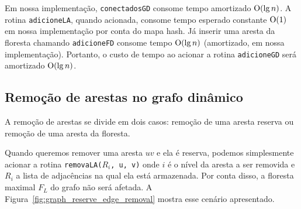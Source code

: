 Em nossa implementação, \texttt{conectadosGD} consome tempo amortizado $\mathrm{O}(\lg n)$. A rotina \texttt{adicioneLA}, quando acionada, consome tempo esperado constante $\mathrm{O}(1)$ em nossa implementação por conta do mapa hash. Já inserir uma aresta da floresta chamando \texttt{adicioneFD} consome tempo $\mathrm{O}(\lg n)$ (amortizado, em nossa implementação). Portanto, o custo de tempo ao acionar a rotina \texttt{adicioneGD} será amortizado $\mathrm{O}(\lg n)$.























































\subsection{Remoção de arestas no grafo dinâmico}
\label{sec:dynamic-graph-edge-removal}

A remoção de arestas se divide em dois casos: remoção de uma aresta reserva ou remoção de uma aresta da floresta.

Quando queremos remover uma aresta $uv$ e ela é reserva, podemos simplesmente acionar a rotina \texttt{removaLA($R_i$, u, v)} onde $i$ é o nível da aresta a ser removida e $R_i$ a lista de adjacências na qual ela está armazenada. Por conta disso, a floresta maximal $F_L$ do grafo não será afetada. A Figura~\ref{fig:graph_reserve_edge_removal} mostra esse cenário apresentado.

